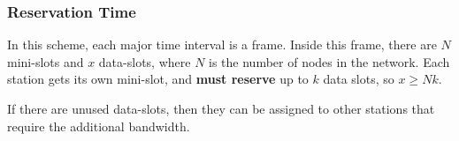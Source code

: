 \subsubsection{Reservation Time}\label{subsubsec:TDMA_Reservation_Time}
In this scheme, each major time interval is a frame.
Inside this frame, there are $N$ mini-slots and $x$ data-slots, where $N$ is the number of nodes in the network.
Each station gets its own mini-slot, and \textbf{must reserve} up to $k$ data slots, so $x \geq Nk$.

If there are unused data-slots, then they can be assigned to other stations that require the additional bandwidth.

